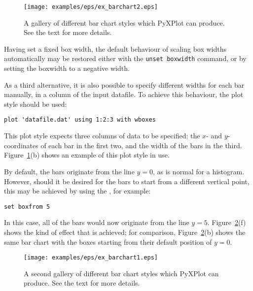 \begin{figure}
\begin{center}
\texttt{[image: examples/eps/ex\_barchart2.eps]}
\end{center}
\caption{A gallery of different bar chart styles which PyXPlot can produce. See the text for more details.}
\label{fig:ex_barchart2}
\end{figure}

Having set a fixed box width, the default behaviour of scaling box widths
automatically may be restored either with the {\tt unset boxwidth} command,
or by setting the boxwidth to a negative width.

As a third alternative, it is also possible to specify different widths for
each bar manually, in a column of the input datafile. To achieve this
behaviour, the  plot style should be used:

\begin{verbatim} 
plot 'datafile.dat' using 1:2:3 with wboxes
\end{verbatim}

\noindent This plot style expects three columns of data to be specified: the
$x$- and $y$-coordinates of each bar in the first two, and the width of the
bars in the third.  Figure~\ref{fig:ex_barchart2}(b) shows an example of this
plot style in use.

By default, the bars originate from the line $y=0$, as is normal for a
histogram. However, should it be desired for the bars to start from a different
vertical point, this may be achieved by using the ,
for example:

\begin{verbatim} 
set boxfrom 5
\end{verbatim}

\noindent In this case, all of the bars would now originate from the line
$y=5$. Figure~\ref{fig:ex_barchart1}(f) shows the kind of effect that is
achieved; for comparison, Figure~\ref{fig:ex_barchart1}(b) shows the same bar
chart with the boxes starting from their default position of $y=0$.

\begin{figure}
\begin{center}
\texttt{[image: examples/eps/ex\_barchart1.eps]}
\end{center}
\caption{A second gallery of different bar chart styles which PyXPlot can produce. See the text for more details.}
\label{fig:ex_barchart1}
\end{figure}

